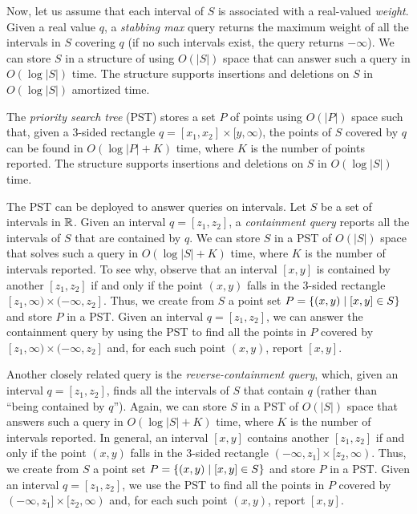 \documentclass[acmsmall,review,anonymous]{acmart}
\def\vgap{\vspace{1mm}}
\begin{document}
{{{\vgap

Now, let us assume that each interval of $S$ is associated with a real-valued {\em weight}. Given a real value $q$, a {\em stabbing max} query returns the maximum weight of all the intervals in $S$ covering $q$ (if no such intervals exist, the query returns $-\infty$). We can store $S$ in a structure of \cite{aak+12} using $O(|S|)$ space that can answer such a query in $O(\log |S|)$ time. The structure supports insertions and deletions on $S$ in $O(\log |S|)$ amortized time.

\vgap

The {\em priority search tree} (PST) \cite{m85} stores a set $P$ of points using $O(|P|)$ space such that, given a 3-sided rectangle $q = [x_1, x_2] \times [y, \infty)$, the points of $S$ covered by $q$ can be found in $O(\log |P| + K)$ time, where $K$ is the number of points reported. The structure supports insertions and deletions on $S$ in $O(\log |S|)$ time.

\vgap

The PST can be deployed to answer queries on intervals. Let $S$ be a set of intervals in $\mathbb{R}$. Given an interval $q = [z_1, z_2]$, a {\em containment query} reports all the intervals of $S$ that are contained by $q$. We can store $S$ in a PST of $O(|S|)$ space that solves such a query in $O(\log |S| + K)$ time, where $K$ is the number of intervals reported. To see why, observe that an interval $[x, y]$ is contained by another $[z_1, z_2]$ if and only if the point $(x, y)$ falls in the 3-sided rectangle $[z_1, \infty) \times (-\infty, z_2]$. Thus, we create from $S$ a point set $P = \{(x, y) \mid [x, y] \in S\}$ and store $P$ in a PST. Given an interval $q = [z_1, z_2]$, we can answer the containment query by using the PST to find all the points in $P$ covered by $[z_1, \infty) \times (-\infty, z_2]$ and, for each such point $(x, y)$, report $[x, y]$.

\vgap

Another closely related query is the {\em reverse-containment query}, which, given an interval $q = [z_1, z_2]$, finds all the intervals of $S$ that contain $q$ (rather than ``being contained by $q$''). Again, we can store $S$ in a PST of $O(|S|)$ space that answers such a query in $O(\log |S| + K)$ time, where $K$ is the number of intervals reported. In general, an interval $[x, y]$ contains another $[z_1, z_2]$ if and only if the point $(x, y)$ falls in the 3-sided rectangle $(-\infty, z_1] \times [z_2, \infty)$. Thus, we create from $S$ a point set $P = \{(x, y) \mid [x, y] \in S\}$ and store $P$ in a PST. Given an interval $q = [z_1, z_2]$, we use the PST to find all the points in $P$ covered by $(-\infty, z_1] \times [z_2, \infty)$ and, for each such point $(x, y)$, report $[x, y]$.

}}}
\end{document}
